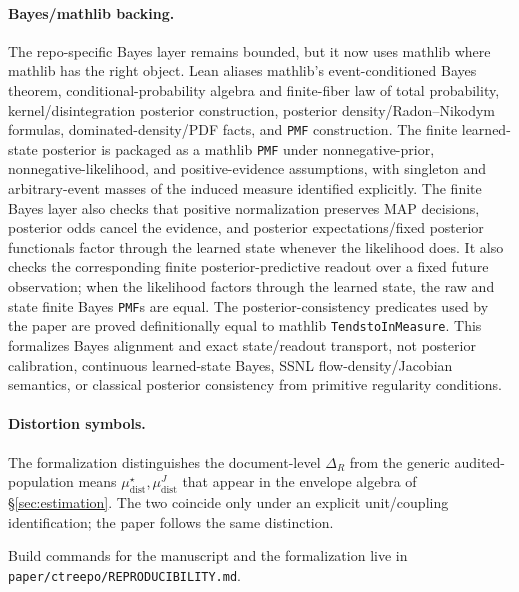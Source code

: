 \paragraph{Bayes/mathlib backing.} The repo-specific Bayes layer remains
bounded, but it now uses mathlib where mathlib has the right object. Lean
aliases mathlib's event-conditioned Bayes theorem, conditional-probability
algebra and finite-fiber law of total probability, kernel/disintegration
posterior construction, posterior density/Radon--Nikodym formulas,
dominated-density/PDF facts, and \texttt{PMF} construction. The finite
learned-state posterior is packaged as a
mathlib \texttt{PMF} under nonnegative-prior, nonnegative-likelihood, and
positive-evidence assumptions, with singleton and arbitrary-event masses of
the induced measure identified explicitly.  The finite Bayes layer also checks
that positive normalization preserves MAP decisions, posterior odds cancel the
evidence, and posterior expectations/fixed posterior functionals factor
through the learned state whenever the likelihood does. It also checks the
corresponding finite posterior-predictive readout over a fixed future
observation; when the likelihood
factors through the learned state, the raw and state finite Bayes \texttt{PMF}s
are equal. The
posterior-consistency predicates used by the paper are proved definitionally
equal to mathlib \texttt{TendstoInMeasure}. This
formalizes Bayes alignment and exact state/readout transport, not posterior
calibration, continuous learned-state Bayes, SSNL flow-density/Jacobian
semantics, or classical posterior consistency from primitive regularity
conditions.

\paragraph{Distortion symbols.} The formalization distinguishes the
document-level $\Delta_R$ from the generic audited-population means
$\mu_{\mathrm{dist}}^\star,\mu_{\mathrm{dist}}^J$ that appear in the
envelope algebra of \S\ref{sec:estimation}. The two coincide only under
an explicit unit/coupling identification; the paper follows the same
distinction.

Build commands for the manuscript and the formalization live in
\texttt{paper/ctreepo/REPRODUCIBILITY.md}.
